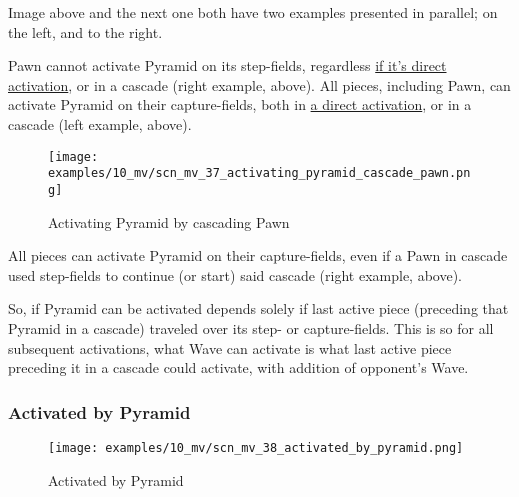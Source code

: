 \vspace*{-0.3\baselineskip}
Image above and the next one both have two examples presented in parallel; on the left,
and to the right.

Pawn cannot activate Pyramid on its step-fields, regardless
\hyperref[fig:scn_ma_04_pyramid_activation_by_pawn]{if it's direct activation}, or in a cascade
(right example, above). All pieces, including Pawn, can activate Pyramid on their capture-fields,
both in \hyperref[fig:scn_ma_01_pyramid_activation_init]{a direct activation}, or in a cascade
(left example, above).

\clearpage %

\vspace*{-2.5\baselineskip}
\noindent
\begin{figure}[!h]
\texttt{[image: examples/10\_mv/scn\_mv\_37\_activating\_pyramid\_cascade\_pawn.png]}
\vspace*{-1.5\baselineskip}
\caption{Activating Pyramid by cascading Pawn}
\label{fig:scn_mv_37_activating_pyramid_cascade_pawn}
\end{figure}

\vspace*{-0.5\baselineskip}
All pieces can activate Pyramid on their capture-fields, even if a Pawn in cascade
used step-fields to continue (or start) said cascade (right example, above).

So, if Pyramid can be activated depends solely if last active piece (preceding that
Pyramid in a cascade) traveled over its step- or capture-fields. This is so for all
subsequent activations, what Wave can activate is what last active piece preceding
it in a cascade could activate, with addition of opponent's Wave.

\clearpage %

\subsubsection*{Activated by Pyramid}
\label{sec:Miranda's veil/Wave/Cascading Waves/Activated by Pyramid}

\vspace*{-1.4\baselineskip}
\noindent
\begin{figure}[!h]
\texttt{[image: examples/10\_mv/scn\_mv\_38\_activated\_by\_pyramid.png]}
\vspace*{-1.3\baselineskip}
\caption{Activated by Pyramid}
\label{fig:scn_mv_38_activated_by_pyramid}
\end{figure}

